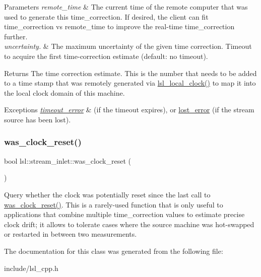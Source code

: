 \begin{DoxyParams}{Parameters}
{\em remote\+\_\+time} & The current time of the remote computer that was used to generate this time\+\_\+correction. If desired, the client can fit time\+\_\+correction vs remote\+\_\+time to improve the real-\/time time\+\_\+correction further. \\
\hline
{\em uncertainty.} & The maximum uncertainty of the given time correction.  Timeout to acquire the first time-\/correction estimate (default\+: no timeout). \\
\hline
\end{DoxyParams}
\begin{DoxyReturn}{Returns}
The time correction estimate. This is the number that needs to be added to a time stamp that was remotely generated via \hyperlink{namespacelsl_a475274f88a060924c9bd1b38879ec63a}{lsl\+\_\+local\+\_\+clock()} to map it into the local clock domain of this machine. 
\end{DoxyReturn}

\begin{DoxyExceptions}{Exceptions}
{\em \hyperlink{classlsl_1_1timeout__error}{timeout\+\_\+error}} & (if the timeout expires), or \hyperlink{classlsl_1_1lost__error}{lost\+\_\+error} (if the stream source has been lost). \\
\hline
\end{DoxyExceptions}
\mbox{\label{classlsl_1_1stream__inlet_ac3b8fa8912090ad6607b05cbb5848352}} 
\subsubsection{\texorpdfstring{was\+\_\+clock\+\_\+reset()}{was\_clock\_reset()}}
{\footnotesize\ttfamily bool lsl\+::stream\+\_\+inlet\+::was\+\_\+clock\+\_\+reset (\begin{DoxyParamCaption}{ }\end{DoxyParamCaption})\hspace{0.3cm}{\ttfamily [inline]}}

Query whether the clock was potentially reset since the last call to \hyperlink{classlsl_1_1stream__inlet_ac3b8fa8912090ad6607b05cbb5848352}{was\+\_\+clock\+\_\+reset()}. This is a rarely-\/used function that is only useful to applications that combine multiple time\+\_\+correction values to estimate precise clock drift; it allows to tolerate cases where the source machine was hot-\/swapped or restarted in between two measurements. 

The documentation for this class was generated from the following file\+:\begin{DoxyCompactItemize}
\item 
include/lsl\+\_\+cpp.\+h\end{DoxyCompactItemize}
